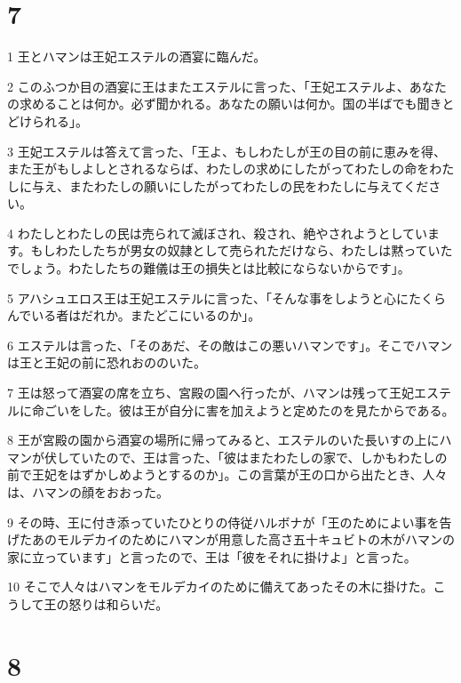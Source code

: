 \chapter{7}

\par 1 王とハマンは王妃エステルの酒宴に臨んだ。
\par 2 このふつか目の酒宴に王はまたエステルに言った、「王妃エステルよ、あなたの求めることは何か。必ず聞かれる。あなたの願いは何か。国の半ばでも聞きとどけられる」。
\par 3 王妃エステルは答えて言った、「王よ、もしわたしが王の目の前に恵みを得、また王がもしよしとされるならば、わたしの求めにしたがってわたしの命をわたしに与え、またわたしの願いにしたがってわたしの民をわたしに与えてください。
\par 4 わたしとわたしの民は売られて滅ぼされ、殺され、絶やされようとしています。もしわたしたちが男女の奴隷として売られただけなら、わたしは黙っていたでしょう。わたしたちの難儀は王の損失とは比較にならないからです」。
\par 5 アハシュエロス王は王妃エステルに言った、「そんな事をしようと心にたくらんでいる者はだれか。またどこにいるのか」。
\par 6 エステルは言った、「そのあだ、その敵はこの悪いハマンです」。そこでハマンは王と王妃の前に恐れおののいた。
\par 7 王は怒って酒宴の席を立ち、宮殿の園へ行ったが、ハマンは残って王妃エステルに命ごいをした。彼は王が自分に害を加えようと定めたのを見たからである。
\par 8 王が宮殿の園から酒宴の場所に帰ってみると、エステルのいた長いすの上にハマンが伏していたので、王は言った、「彼はまたわたしの家で、しかもわたしの前で王妃をはずかしめようとするのか」。この言葉が王の口から出たとき、人々は、ハマンの顔をおおった。
\par 9 その時、王に付き添っていたひとりの侍従ハルボナが「王のためによい事を告げたあのモルデカイのためにハマンが用意した高さ五十キュビトの木がハマンの家に立っています」と言ったので、王は「彼をそれに掛けよ」と言った。
\par 10 そこで人々はハマンをモルデカイのために備えてあったその木に掛けた。こうして王の怒りは和らいだ。

\chapter{8}

